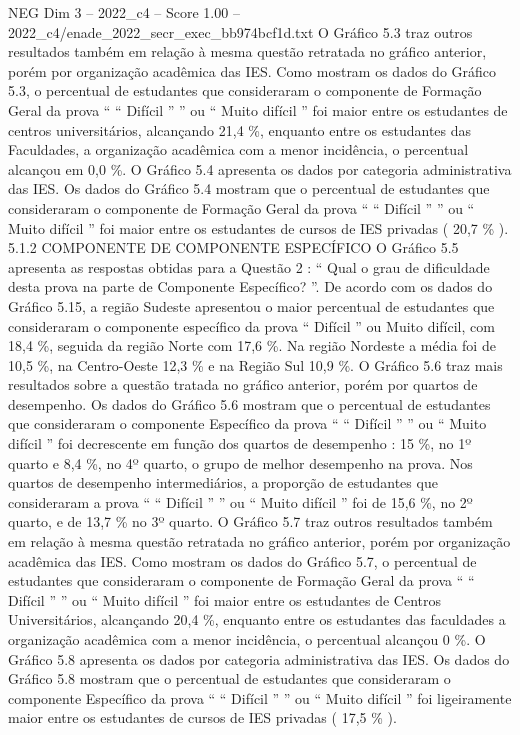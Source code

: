 \begin{textsample}{NEG Dim 3 – 2022\_c4 – Score 1.00 – 2022\_c4/enade\_2022\_secr\_exec\_bb974bcf1d.txt}
O Gráfico 5.3 traz outros resultados também em relação à mesma questão retratada no gráfico anterior, porém por organização acadêmica das IES.
Como mostram os dados do Gráfico 5.3, o percentual de estudantes que consideraram o componente de Formação Geral da prova “ “ Difícil ” ” ou “ Muito difícil ” foi maior entre os estudantes de centros universitários, alcançando 21,4 \%, enquanto entre os estudantes das Faculdades, a organização acadêmica com a menor incidência, o percentual alcançou em 0,0 \%.
O Gráfico 5.4 apresenta os dados por categoria administrativa das IES.
Os dados do Gráfico 5.4 mostram que o percentual de estudantes que consideraram o componente de Formação Geral da prova “ “ Difícil ” ” ou “ Muito difícil ” foi maior entre os estudantes de cursos de IES privadas ( 20,7 \% ). 5.1.2 COMPONENTE DE COMPONENTE ESPECÍFICO O Gráfico 5.5 apresenta as respostas obtidas para a Questão 2 : “ Qual o grau de dificuldade desta prova na parte de Componente Específico? ”.
De acordo com os dados do Gráfico 5.15, a região Sudeste apresentou o maior percentual de estudantes que consideraram o componente específico da prova “ Difícil ” ou Muito difícil, com 18,4 \%, seguida da região Norte com 17,6 \%.
Na região Nordeste a média foi de 10,5 \%, na Centro-Oeste 12,3 \% e na Região Sul 10,9 \%.
O Gráfico 5.6 traz mais resultados sobre a questão tratada no gráfico anterior, porém por quartos de desempenho.
Os dados do Gráfico 5.6 mostram que o percentual de estudantes que consideraram o componente Específico da prova “ “ Difícil ” ” ou “ Muito difícil ” foi decrescente em função dos quartos de desempenho : 15 \%, no 1º quarto e 8,4 \%, no 4º quarto, o grupo de melhor desempenho na prova.
Nos quartos de desempenho intermediários, a proporção de estudantes que consideraram a prova “ “ Difícil ” ” ou “ Muito difícil ” foi de 15,6 \%, no 2º quarto, e de 13,7 \% no 3º quarto.
O Gráfico 5.7 traz outros resultados também em relação à mesma questão retratada no gráfico anterior, porém por organização acadêmica das IES.
Como mostram os dados do Gráfico 5.7, o percentual de estudantes que consideraram o componente de Formação Geral da prova “ “ Difícil ” ” ou “ Muito difícil ” foi maior entre os estudantes de Centros Universitários, alcançando 20,4 \%, enquanto entre os estudantes das faculdades a organização acadêmica com a menor incidência, o percentual alcançou 0 \%.
O Gráfico 5.8 apresenta os dados por categoria administrativa das IES.
Os dados do Gráfico 5.8 mostram que o percentual de estudantes que consideraram o componente Específico da prova “ “ Difícil ” ” ou “ Muito difícil ” foi ligeiramente maior entre os estudantes de cursos de IES privadas ( 17,5 \% ).

\end{textsample}
